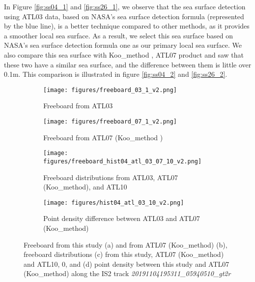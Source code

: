 %
In Figure \ref{fig:ss04_1} and \ref{fig:ss26_1}, we observe that the sea surface detection using ATL03 data, based on NASA's sea surface detection formula (represented by the blue line), is a better technique compared to other methods, as it provides a smoother local sea surface. As a result, we select this sea surface based on NASA's sea surface detection formula one as our primary local sea surface. We also compare this sea surface with Koo\_method \cite{koo2023sea}, ATL07 product and saw that these two have a similar sea surface, and the difference between them is little over 0.1m. This comparison is illustrated in figure \ref{fig:ss04_2} and \ref{fig:ss26_2}. 

\begin{figure}[!htb]
        \centering
        \begin{subfigure}[b]{\linewidth}
            \centering
            \texttt{[image: figures/freeboard\_03\_1\_v2.png]}
            \caption{Freeboard from ATL03}
            \label{fig:freeboard_03_1}
        \end{subfigure}
        \begin{subfigure}[b]{\linewidth}
            \centering
            \texttt{[image: figures/freeboard\_07\_1\_v2.png]}
            \caption{Freeboard from ATL07 (Koo\_method \cite{koo2023sea})}
            \label{fig:freeboard_07_1}
        \end{subfigure}
        \begin{subfigure}[b]{0.9\linewidth}
            \centering
            \texttt{[image: figures/freeboard\_hist04\_atl\_03\_07\_10\_v2.png]}
            \caption{Freeboard distributions from ATL03, ATL07 (Koo\_method), and ATL10}
            \label{fig:freeboard_hist04_atl_03_07_10}
        \end{subfigure}
        \begin{subfigure}[b]{\linewidth}
            \centering
            \texttt{[image: figures/hist04\_atl\_03\_10\_v2.png]}
            \caption{Point density difference between ATL03 and ATL07 (Koo\_method)}
            \label{fig:hist04_atl_03_10}
        \end{subfigure}
    \caption{Freeboard from this study (a) and from ATL07 (Koo\_method) (b), freeboard distributions (c) from this study, ATL07 (Koo\_method) and ATL10, 0, and (d) point density between this study and ATL07 (Koo\_method) along the IS2 track \textit{20191104195311\_05940510\_gt2r}}
    \label{fig:freeboard_comp1}
\end{figure}

